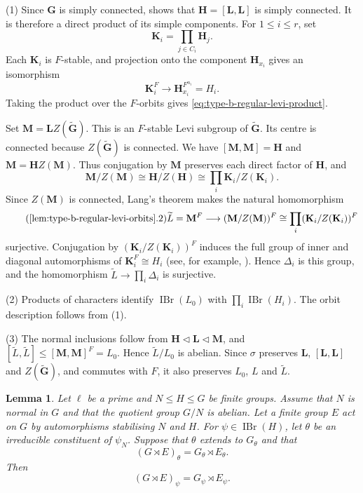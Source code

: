 \documentclass[10pt]{amsart}
\newtheorem{lemma}[theorem]{Lemma}
\theoremstyle{definition}
\renewcommand{\leq}{\leqslant}
\let\oldendproof\endproof
\renewenvironment{proof}[1][\proofname]{%
  \oldproof[\bfseries #1]%
}{\oldendproof}
\DeclareMathOperator{\IBr}{IBr}
\numberwithin{equation}{section}
\numberwithin{table}{section}
\begin{document}
\begin{proof}
\textup{(1)} Since $\mathbf G$ is simply connected,
\cite[Proposition~12.14]{MalleTesterman2011} shows that
$\mathbf H=[\mathbf L,\mathbf L]$ is simply connected.
It is therefore a direct product of its simple components.
For $1\leq i\leq r$, set
\[
 \mathbf K_i=\prod_{j\in C_i}\mathbf H_j.
\]
Each $\mathbf K_i$ is $F$-stable, and projection onto the component
$\mathbf H_{x_i}$ gives an isomorphism
\[
 \mathbf K_i^F\longrightarrow\mathbf H_{x_i}^{F^{n_i}}=H_i.
\]
Taking the product over the $F$-orbits gives
\eqref{eq:type-b-regular-levi-product}.

Set $\mathbf M=\mathbf LZ(\widetilde{\mathbf G})$.
This is an $F$-stable Levi subgroup of $\widetilde{\mathbf G}$.
Its centre is connected because $Z(\widetilde{\mathbf G})$ is connected.
We have $[\mathbf M,\mathbf M]=\mathbf H$ and
$\mathbf M=\mathbf HZ(\mathbf M)$. Thus conjugation by $\mathbf M$
preserves each direct factor of $\mathbf H$, and
\[
 \mathbf M/Z(\mathbf M)\cong\mathbf H/Z(\mathbf H)
 \cong\prod_i\mathbf K_i/Z(\mathbf K_i).
\]
Since $Z(\mathbf M)$ is connected, Lang's theorem makes the natural
homomorphism
\begin{equation}\tag{\ref{lem:type-b-regular-levi-orbits}.2}\label{eq:type-b-regular-levi-action}
 \widetilde L=\mathbf M^F\longrightarrow
 (\mathbf M/Z(\mathbf M))^F
 \cong\prod_i(\mathbf K_i/Z(\mathbf K_i))^F
\end{equation}
surjective. Conjugation by $(\mathbf K_i/Z(\mathbf K_i))^F$ induces
the full group of inner and diagonal automorphisms of
$\mathbf K_i^F\cong H_i$
(see, for example, \cite[Remark~1.5.12]{GeckMalle2020}). Hence $\Delta_i$
is this group, and the homomorphism $\widetilde L\longrightarrow\prod_i\Delta_i$
is surjective.

\textup{(2)} Products of characters identify $\IBr(L_0)$ with
$\prod_i\IBr(H_i)$.  The orbit description follows from
\textup{(1)}.

\textup{(3)} The normal inclusions follow from
$\mathbf H\lhd\mathbf L\lhd\mathbf M$, and
$[\widetilde L,\widetilde L]\leq[\mathbf M,\mathbf M]^F=L_0$.
Hence $\widetilde L/L_0$ is abelian.
Since $\sigma$ preserves $\mathbf L$, $[\mathbf L,\mathbf L]$ and
$Z(\widetilde{\mathbf G})$, and commutes with $F$, it also preserves
$L_0$, $L$ and $\widetilde L$.
\end{proof}

\begin{lemma}\label{lem:type-b-char2-clifford}
Let $\ell$ be a prime and $N\leq H\leq G$ be finite groups. Assume that $N$ is
normal in $G$ and that the quotient group $G/N$ is abelian.
Let a finite group $E$ act on $G$ by automorphisms
stabilising $N$ and $H$.  For $\psi\in\IBr(H)$, let $\theta$ be an irreducible constituent of $\psi_N$.  Suppose that $\theta$ extends
to $G_\theta$ and that
\[
 (G\rtimes E)_\theta
 =G_\theta\rtimes E_\theta.
\]
Then
\[
 (G\rtimes E)_\psi
 =G_\psi\rtimes E_\psi.
\]
\end{lemma}
\end{document}
